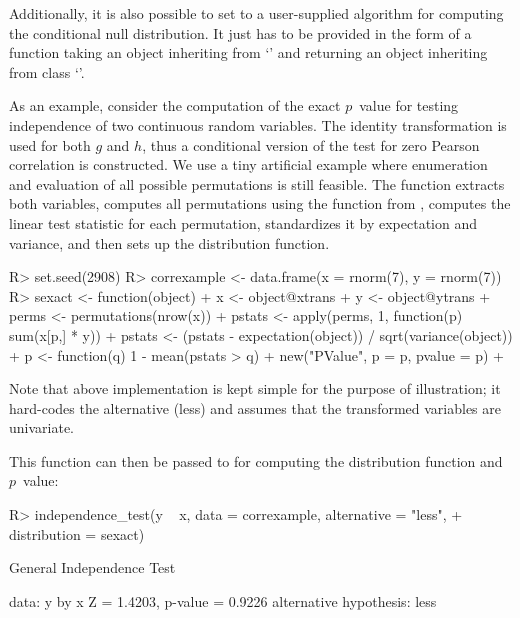 \documentclass[article]{jss}
\newcommand{\Rclass}[1]{`\code{#1}'}
\begin{document}
Additionally, it is also possible to set  to a user-supplied
algorithm for computing the conditional null distribution. It just has to be
provided in the form of a function taking an object inheriting from
\Rclass{IndependenceTestStatistic} and returning an object inheriting from
class \Rclass{PValue}.

As an example, consider the computation of the exact $p$~value
for testing independence of two continuous random variables. The identity
transformation is used for both $g$ and $h$, thus a conditional version of
the test for zero Pearson correlation is constructed. We use a tiny artificial
example where enumeration and evaluation of all possible permutations is still
feasible. The function  extracts both variables, computes
all permutations using the function  from 
\citep{PKG:e1071}, computes the linear test statistic for each permutation,
standardizes it by expectation and variance, and then sets up the 
distribution function.
\begin{Schunk}
\begin{Sinput}
R> set.seed(2908)
R> correxample <- data.frame(x = rnorm(7), y = rnorm(7))
R> sexact <- function(object) {
+    x <- object@xtrans  
+    y <- object@ytrans  
+    perms <- permutations(nrow(x))
+    pstats <- apply(perms, 1, function(p) sum(x[p,] * y))
+    pstats <- (pstats - expectation(object)) / sqrt(variance(object)) 
+    p <- function(q) 1 - mean(pstats > q)
+    new("PValue", p = p, pvalue = p)
+  }
\end{Sinput}
\end{Schunk}
Note that above implementation is kept simple for the purpose of
illustration; it hard-codes the alternative (less) and assumes that the
transformed variables are univariate.

This function can then be passed to  for
computing the distribution function and $p$~value:
\begin{Schunk}
\begin{Sinput}
R> independence_test(y ~ x, data = correxample, alternative = "less",
+    distribution = sexact)
\end{Sinput}
\begin{Soutput}
	General Independence Test

data:  y by x 
Z = 1.4203, p-value = 0.9226
alternative hypothesis: less 
\end{Soutput}
\end{Schunk}
\end{document}
